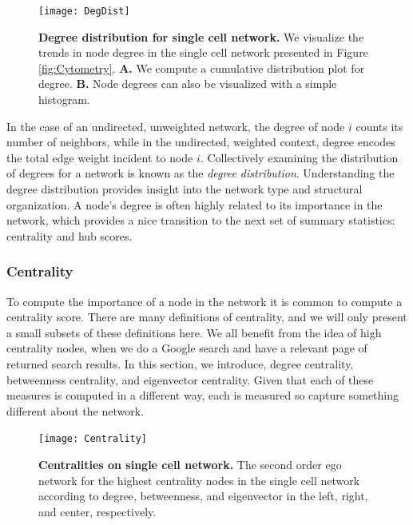 \begin{figure}
\begin{center}
\texttt{[image: DegDist]}
\caption{{\bf Degree distribution for single cell network.} We visualize the trends in node degree in the single cell network presented in Figure \ref{fig:Cytometry}. {\bf A.} We compute a cumulative distribution plot for degree. {\bf B.} Node degrees can also be visualized with a simple histogram.}
\label{fig:DegDist}
\end{center}
\end{figure}

In the case of an undirected, unweighted network, the degree of node $i$ counts its number of neighbors, while in the undirected, weighted context, degree encodes the total edge weight incident to node $i$. Collectively examining the distribution of degrees for a network is known as the \emph{degree distribution}. Understanding the degree distribution provides insight into the network type and structural organization. A node's degree is often highly related to its importance in the network, which provides a nice transition to the next set of summary statistics: centrality and hub scores.

\subsubsection{Centrality}
\indent To compute the importance of a node in the network it is common to compute a centrality score. There are many definitions of centrality, and we will only present a small subsets of these definitions here. We all benefit from the idea of high centrality nodes, when we do a Google search and have a relevant page of returned search results. In this section, we introduce, degree centrality, betweenness centrality, and eigenvector centrality. Given that each of these measures is computed in a different way, each is measured so capture something different about the network. 

 \begin{figure}[h!]
\begin{center}
\texttt{[image: Centrality]}
\caption{{\bf Centralities on single cell network.} The second order ego network for the highest centrality nodes in the single cell network according to degree, betweenness, and eigenvector in the left, right, and center, respectively.}
\label{fig:Centrality}
\end{center}
\end{figure}

